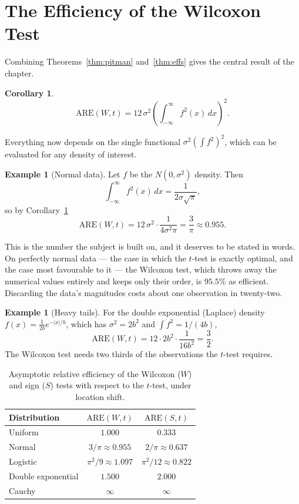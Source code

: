 \documentclass[12pt,a4paper]{report}
\theoremstyle{definition}
\newtheorem{exa}[thm]{Example}
\theoremstyle{plain}
\newtheorem{coro}[thm]{Corollary}
\begin{document}
\section{The Efficiency of the Wilcoxon Test}

Combining Theorems~\ref{thm:pitman} and~\ref{thm:effs} gives the central result
of the chapter.

\begin{coro}
\label{coro:wt}
$$\mathrm{ARE}(W,t) = 12\,\sigma^{2}
\left(\int^{\infty}_{-\infty}f^{2}(x)\,dx\right)^{2} .$$
\end{coro}

Everything now depends on the single functional
$\sigma^{2}\left(\int f^{2}\right)^{2}$, which can be evaluated for any density
of interest.

\begin{exa}[Normal data]
Let $f$ be the $N(0,\sigma^{2})$ density. Then
$$\int^{\infty}_{-\infty}f^{2}(x)\,dx = \frac{1}{2\sigma\sqrt{\pi}},$$
so by Corollary~\ref{coro:wt}
$$\mathrm{ARE}(W,t) = 12\,\sigma^{2}\cdot\frac{1}{4\sigma^{2}\pi}
= \frac{3}{\pi} \approx 0.955 .$$
\end{exa}

This is the number the subject is built on, and it deserves to be stated in
words. On perfectly normal data --- the case in which the $t$-test is exactly
optimal, and the case most favourable to it --- the Wilcoxon test, which throws
away the numerical values entirely and keeps only their order, is $95.5\%$ as
efficient. Discarding the data's magnitudes costs about one observation in
twenty-two.

\begin{exa}[Heavy tails]
For the double exponential (Laplace) density
$f(x)=\tfrac{1}{2b}e^{-|x|/b}$, which has $\sigma^{2}=2b^{2}$ and
$\int f^{2} = 1/(4b)$,
$$\mathrm{ARE}(W,t) = 12\cdot 2b^{2}\cdot\frac{1}{16b^{2}} = \frac{3}{2}.$$
The Wilcoxon test needs two thirds of the observations the $t$-test requires.
\end{exa}

\begin{table}[H]
\centering
\begin{tabular}{lcc}
\hline
\textbf{Distribution} & $\mathrm{ARE}(W,t)$ & $\mathrm{ARE}(S,t)$ \\
\hline
Uniform            & $1.000$  & $0.333$ \\
Normal             & $3/\pi \approx 0.955$ & $2/\pi\approx 0.637$ \\
Logistic           & $\pi^{2}/9 \approx 1.097$ & $\pi^{2}/12\approx 0.822$ \\
Double exponential & $1.500$  & $2.000$ \\
Cauchy             & $\infty$ & $\infty$ \\
\hline
\end{tabular}
\caption{Asymptotic relative efficiency of the Wilcoxon ($W$) and sign ($S$)
tests with respect to the $t$-test, under location shift.}
\label{tab:are}
\end{table}
\end{document}
